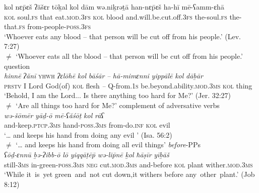 \documentclass[output=paper]{langsci/langscibook}
\begin{document}
    \gll kol  nɛ\={p}ɛš   ʔăšɛr tōḵal             kol  dām     wə.niḵrəṯā                     han-nɛ\={p}ɛš   ha-hī         mē-ʕamm-ɛhā\\
         \textsc{kol} soul.\textsc{fs} that   eat.\textsc{mod.3fs} \textsc{kol}  blood and.will.be.cut.off.\textsc{3fs}  the-soul.\textsc{fs} the-that.\textsc{fs} from-people{}-\textsc{poss.3fs}\\
    \glt `Whoever eats any blood – that person will be cut off from his people.' (Lev. 7:27)\\
        ${\neq}$  `Whoever eats all the blood – that person will be cut off from his people.'
\ex %
    question\label{ex:doron:40}\\
    \gll \textit{hinnē}  \textit{ʔănī} \textsc{yhwh}  \textit{ʔɛlōhē}   \textit{kol}   \textit{bāśār} \textit{–}  \textit{hā-mimɛnni}  \textit{yippālē}                                  \textit{kol}   \textit{dāḇār}\\
         \textsc{prstv} I      Lord    God(of) \textsc{kol} flesh  \textit{–}  Q-from.1\textsc{s}    be.beyond.ability.\textsc{mod.3ms}  \textsc{kol} thing \\
    \glt `Behold, I am the Lord... Is there anything too hard for Me?' (Jer. 32:27)\\
        ${\neq}$   `Are all things too hard for Me?'
\ex %
    complement of adversative verbs\label{ex:doron:41}\\
    \gll \textit{wə-šōmēr}                  \textit{yāḏ-ō}                 \textit{mē-ʕăśōṯ}      \textit{kol}   \textit{rāʕ}\\
         and-keep.\textsc{ptcp.3ms}  hand{}-\textsc{poss.3ms} from-do.\textsc{inf}  \textsc{kol} evil \\
    \glt `… and keeps his hand from doing any evil ' (Isa. 56:2)\\
        ${\neq}$  `… and keeps his hand from doing all evil things'
\pagebreak\ex %
    \textit{before}{}-PPs\label{ex:doron:42}\\
    \gll \textit{ʕōḏ-ɛnnū}  \textit{ḇə-ʔibb-ō}                \textit{lō}     \textit{yiqqāṭē\={p}}         \textit{wə-li\={p}nē}       \textit{ḵol}   \textit{ħāṣīr}  \textit{yīḇāš}\\
         still-\textsc{3ms} in-green-\textsc{poss.3ms}  \textsc{neg}   cut.\textsc{mod.3ms}  and-before  \textsc{kol} plant  wither.\textsc{mod.3ms}\\
    \glt `While it~is~yet green~and~not cut down,it withers before any~other~plant.' (Job 8:12)\\
\end{document}
